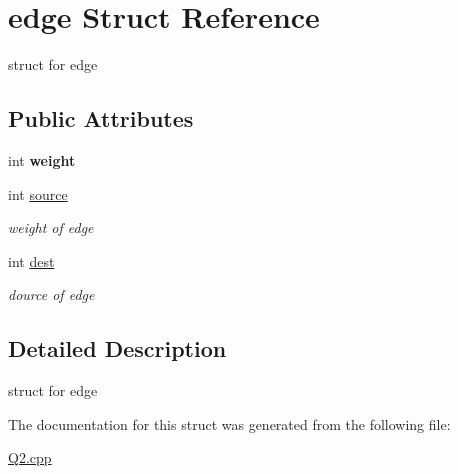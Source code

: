 \hypertarget{structedge}{}\section{edge Struct Reference}
\label{structedge}


struct for edge  


\subsection*{Public Attributes}
\begin{DoxyCompactItemize}
\item 
\mbox{\label{structedge_a48182e762296a60018039747493814f1}} 
int {\bfseries weight}
\item 
\mbox{\label{structedge_a123c11d0720940e8a2556269ad340118}} 
int \hyperlink{structedge_a123c11d0720940e8a2556269ad340118}{source}
\begin{DoxyCompactList}\small\item\em weight of edge \end{DoxyCompactList}\item 
\mbox{\label{structedge_a151f575c42adbb9936d24cb39204001d}} 
int \hyperlink{structedge_a151f575c42adbb9936d24cb39204001d}{dest}
\begin{DoxyCompactList}\small\item\em dource of edge \end{DoxyCompactList}\end{DoxyCompactItemize}


\subsection{Detailed Description}
struct for edge 

The documentation for this struct was generated from the following file\+:\begin{DoxyCompactItemize}
\item 
\hyperlink{Q2_8cpp}{Q2.\+cpp}\end{DoxyCompactItemize}
